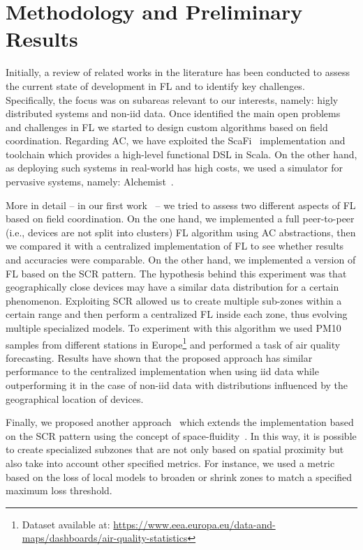 \documentclass[runningheads]{llncs}
\begin{document}
\section{Methodology and Preliminary Results}\label{sec:methodology}

 Initially, a review of related works in the literature has been conducted to assess the current state of development in FL 
  and to identify key challenges.
 Specifically, the focus was on subareas relevant to our interests, namely: 
  higly distributed systems and non-iid data.
 Once identified the main open problems and challenges in FL we started to design custom algorithms based 
  on field coordination.
  Regarding AC, we have exploited the ScaFi~\cite{DBLP:journals/softx/CasadeiVAP22} implementation and toolchain
  which provides a high-level functional DSL in Scala.
  On the other hand, as deploying such systems in real-world has high costs, we used a simulator for pervasive systems, 
  namely: Alchemist~\cite{DBLP:journals/jos/PianiniMV13}.
 
 More in detail -- in our first work~\cite{DBLP:conf/coordination/DominiAEV24} -- we tried to assess two different aspects of
  FL based on field coordination.
 On the one hand, we implemented a full peer-to-peer (i.e., devices are not split into clusters) FL algorithm using AC abstractions, then we compared it with a 
  centralized implementation of FL to see whether results and accuracies were comparable.
 On the other hand, we implemented a version of FL based on the SCR pattern. 
 The hypothesis behind this experiment was that geographically close devices may have a similar data 
  distribution for a certain phenomenon.
 Exploiting SCR allowed us to create multiple sub-zones within a certain range and then perform a centralized FL inside each zone,
  thus evolving multiple specialized models.
 To experiment with this algorithm we used PM10 samples from different stations in Europe\footnote{Dataset available at: \url{https://www.eea.europa.eu/data-and-maps/dashboards/air-quality-statistics}}
  and performed a task of air quality forecasting.
 Results have shown that the proposed approach has similar performance to the centralized implementation when using iid data 
  while outperforming it in the case of non-iid data with distributions influenced by the geographical location of devices.
 
 Finally, we proposed another approach~\cite{DBLP:conf/acsos/DominiFAVE24} which extends the implementation based on the SCR pattern
     using the concept of space-fluidity~\cite{DBLP:journals/lmcs/CasadeiMPVZ23}.
 In this way, it is possible to create specialized subzones that are not only based on spatial proximity but also take into account other 
  specified metrics.
 For instance, we used a metric based on the loss of local models to broaden or shrink zones to match a specified 
  maximum loss threshold.   
\end{document}
